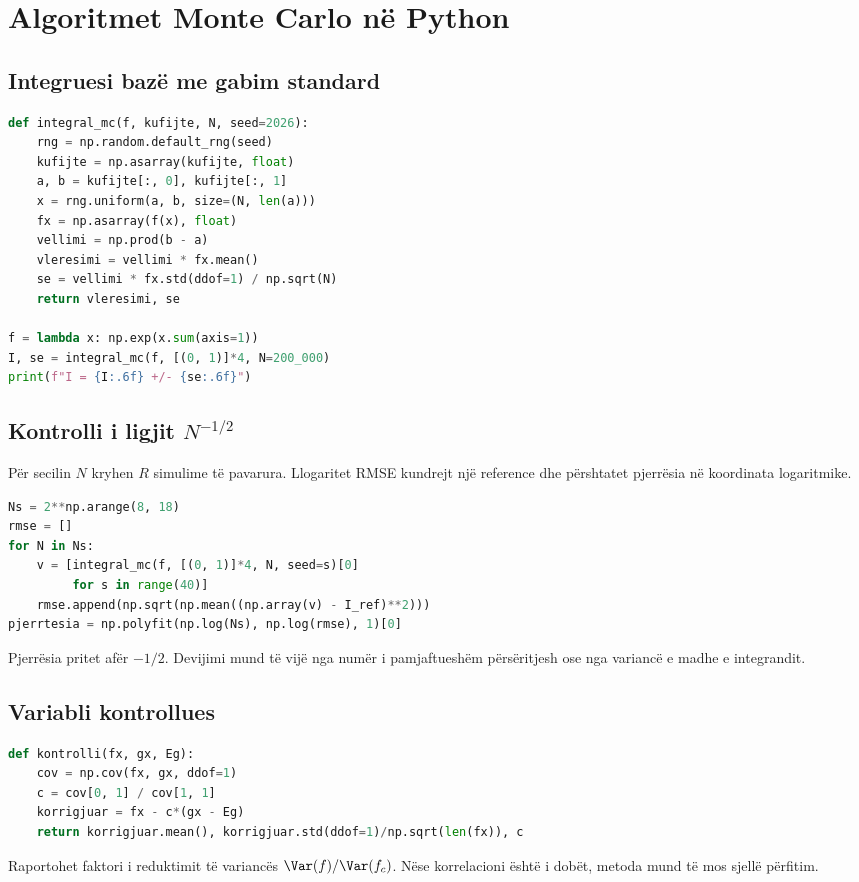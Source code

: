 \section{Algoritmet Monte Carlo në Python}
\subsection{Integruesi bazë me gabim standard}
\begin{lstlisting}[language=Python,caption={Integrimi uniform në një kuti shumëpërmasore.}]
def integral_mc(f, kufijte, N, seed=2026):
    rng = np.random.default_rng(seed)
    kufijte = np.asarray(kufijte, float)
    a, b = kufijte[:, 0], kufijte[:, 1]
    x = rng.uniform(a, b, size=(N, len(a)))
    fx = np.asarray(f(x), float)
    vellimi = np.prod(b - a)
    vleresimi = vellimi * fx.mean()
    se = vellimi * fx.std(ddof=1) / np.sqrt(N)
    return vleresimi, se

f = lambda x: np.exp(x.sum(axis=1))
I, se = integral_mc(f, [(0, 1)]*4, N=200_000)
print(f"I = {I:.6f} +/- {se:.6f}")
\end{lstlisting}

\subsection{Kontrolli i ligjit $N^{-1/2}$}
Për secilin $N$ kryhen $R$ simulime të pavarura. Llogaritet RMSE kundrejt një reference dhe përshtatet pjerrësia në koordinata logaritmike.
\begin{lstlisting}[language=Python]
Ns = 2**np.arange(8, 18)
rmse = []
for N in Ns:
    v = [integral_mc(f, [(0, 1)]*4, N, seed=s)[0]
         for s in range(40)]
    rmse.append(np.sqrt(np.mean((np.array(v) - I_ref)**2)))
pjerrtesia = np.polyfit(np.log(Ns), np.log(rmse), 1)[0]
\end{lstlisting}
Pjerrësia pritet afër $-1/2$. Devijimi mund të vijë nga numër i pamjaftueshëm përsëritjesh ose nga variancë e madhe e integrandit.

\subsection{Variabli kontrollues}
\begin{lstlisting}[language=Python,caption={Reduktimi i variancës me një madhësi të korreluar.}]
def kontrolli(fx, gx, Eg):
    cov = np.cov(fx, gx, ddof=1)
    c = cov[0, 1] / cov[1, 1]
    korrigjuar = fx - c*(gx - Eg)
    return korrigjuar.mean(), korrigjuar.std(ddof=1)/np.sqrt(len(fx)), c
\end{lstlisting}
Raportohet faktori i reduktimit të variancës $\Var(f)/\Var(f_c)$. Nëse korrelacioni është i dobët, metoda mund të mos sjellë përfitim.

